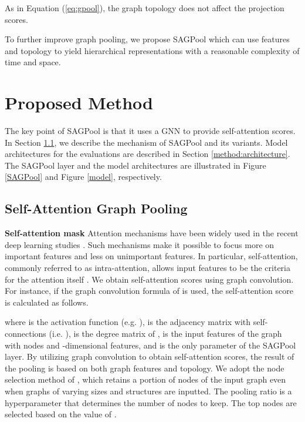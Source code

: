 \documentclass{article}
\begin{document}
As in Equation (\ref{eq:gpool}), the graph topology does not affect the projection scores. 


To further improve graph pooling, we propose SAGPool which can use features and topology to yield hierarchical representations with a reasonable complexity of time and space.



 \section{Proposed Method}
\label{method}
The key point of SAGPool is that it uses a GNN to provide self-attention scores. In Section \ref{method:SAGP}, we describe the mechanism of SAGPool and its variants. Model architectures for the evaluations are described in Section \ref{method:architecture}. The SAGPool layer and the model architectures are illustrated in Figure \ref{SAGPool} and Figure \ref{model}, respectively.

\subsection{Self-Attention Graph Pooling}
\label{method:SAGP}

\textbf{Self-attention mask} 
Attention mechanisms have been widely used in the recent deep learning studies \cite{parikh2016decomposable, cheng2016long, zhang2018self, veličković2018graph}. Such mechanisms make it possible to focus more on important features and less on unimportant features. In particular, self-attention, commonly referred to as intra-attention, allows input features to be the criteria for the attention itself \cite{vaswani2017attention}. We obtain self-attention scores using graph convolution. For instance, if the graph convolution formula of \citeauthor{kipf2016semi} is used, the self-attention score  is calculated as follows.

where  is the activation function (e.g. ),  is the adjacency matrix with self-connections (i.e. ),  is the degree matrix of ,  is the input features of the graph with  nodes and -dimensional features, and  is the only parameter of the SAGPool layer. By utilizing graph convolution to obtain self-attention scores, the result of the pooling is based on both graph features and topology. We adopt the node selection method of \citeauthor{gao2019graph, cangea2018towards}, which retains a portion of nodes of the input graph even when graphs of varying sizes and structures are inputted. The pooling ratio  is a hyperparameter that determines the number of nodes to keep. The top  nodes are selected based on the value of .
\end{document}
